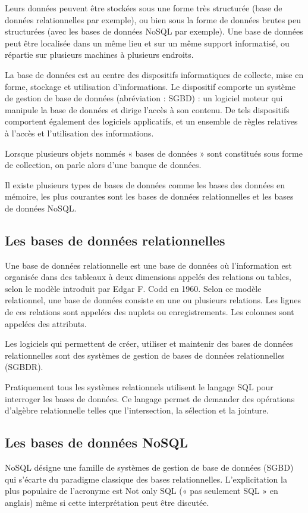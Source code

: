 Leurs données peuvent être stockées sous une forme très structurée
(base de données relationnelles par exemple), ou bien sous la forme de données brutes
peu structurées (avec les bases de données NoSQL par exemple). Une base de données peut
être localisée dans un même lieu et sur un même support informatisé, ou répartie sur
plusieurs machines à plusieurs endroits.

La base de données est au centre des dispositifs informatiques de collecte, mise en forme,
stockage et utilisation d'informations. Le dispositif comporte un système de gestion de
base de données (abréviation : SGBD) : un logiciel moteur qui manipule la base de données et
dirige l'accès à son contenu. De tels dispositifs comportent également des logiciels applicatifs, et
un ensemble de règles relatives à l'accès et l'utilisation des informations.

Lorsque plusieurs objets nommés « bases de données » sont constitués sous forme de collection,
on parle alors d'une banque de données.

Il existe plusieurs types de bases de données comme les bases des données en mémoire, les plus courantes sont les bases de données
relationnelles et les bases de données NoSQL.

\subsection{Les bases de données relationnelles}\label{subsec:base-de-donnees-relationnelles}
Une base de données relationnelle est une base de données où l'information est
organisée dans des tableaux à deux dimensions appelés des relations ou tables, selon
le modèle introduit par Edgar F. Codd en 1960. Selon ce modèle relationnel, une base de
données consiste en une ou plusieurs relations. Les lignes de ces relations sont appelées
des nuplets ou enregistrements. Les colonnes sont appelées des attributs.

Les logiciels qui permettent de créer, utiliser et maintenir des bases de données relationnelles
sont des systèmes de gestion de bases de données relationnelles (SGBDR).

Pratiquement tous les systèmes relationnels utilisent le langage SQL pour interroger les bases de
données. Ce langage permet de demander des opérations d'algèbre relationnelle telles que l'intersection,
la sélection et la jointure.

\subsection{Les bases de données NoSQL}\label{subsec:base-de-donnees-nosql}
NoSQL désigne une famille de systèmes de gestion de base de données (SGBD) qui s'écarte
du paradigme classique des bases relationnelles. L'explicitation la plus populaire de
l'acronyme est Not only SQL (« pas seulement SQL » en anglais) même si cette
interprétation peut être discutée.

